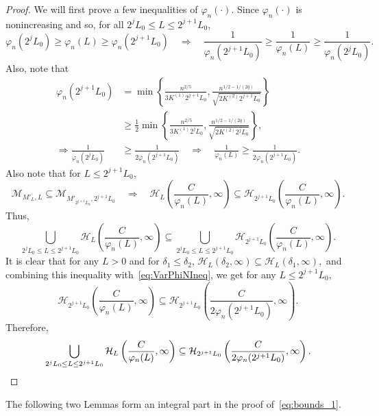 \begin{proof}
We will first prove a few inequalities of $\varphi_n(\cdot)$. Since $\varphi_n(\cdot)$ is nonincreasing and so, for all $2^jL_0 \le L \le 2^{j+1}L_0$,
\[
\varphi_n(2^jL_0) \ge \varphi_n(L) \ge \varphi_n(2^{j+1}L_0)\quad\Rightarrow\quad \frac{1}{\varphi_n(2^{j+1}L_0)} \ge \frac{1}{\varphi_n(L)} \ge \frac{1}{\varphi_n(2^jL_0)}.
\]
Also, note that
\begin{align}
\varphi_n(2^{j+1}L_0) &= \min\left\{\frac{n^{2/5}}{3K^{(1)}2^{j+1}L_0}, \frac{n^{1/2 - 1/(2q)}}{\sqrt{2K^{(2)}2^{j+1}L_0}}\right\}\nonumber\\
&\ge \frac{1}{2}\min\left\{\frac{n^{2/5}}{3K^{(1)}2^{j}L_0}, \frac{n^{1/2 - 1/(2q)}}{\sqrt{2K^{(2)}2^{j}L_0}}\right\},\nonumber\\
\Rightarrow \frac{1}{\varphi_n(2^jL_0)} &\ge \frac{1}{2\varphi_n(2^{j+1}L_0)}\quad\Rightarrow\quad \frac{1}{\varphi_n(L)} \ge \frac{1}{2\varphi_n(2^{j+1}L_0)}.\label{eq:VarPhiNIneq}
\end{align}
Also note that for $L \le 2^{j+1}L_0$,
\[
\mathcal{M}_{M'_L, L} \subseteq \mathcal{M}_{M'_{2^{j+1}L_0}, 2^{j+1}L_0}\quad\Rightarrow\quad \mathcal{H}_{L}\left(\frac{C}{\varphi_n(L)}, \infty\right)\subseteq\mathcal{H}_{2^{j+1}L_0}\left(\frac{C}{\varphi_n(L)}, \infty\right).
\]
Thus,
\begin{equation*}
\bigcup_{2^jL_0 \le L\le 2^{j+1}L_0}\mathcal{H}_L\left(\frac{C}{\varphi_n(L)}, \infty\right) \subseteq \bigcup_{2^jL_0 \le L\le 2^{j+1}L_0}\mathcal{H}_{2^{j+1}L_0}\left(\frac{C}{\varphi_n(L)}, \infty\right).
\end{equation*}
It is clear that for any $L > 0$ and for $\delta_1 \le \delta_2$, $\mathcal{H}_L\left(\delta_2, \infty\right) \subseteq \mathcal{H}_L\left(\delta_1, \infty\right),$ and combining this inequality with~\eqref{eq:VarPhiNIneq}, we get for any $L \le 2^{j+1}L_0$,
\[
\mathcal{H}_{2^{j+1}L_0}\left(\frac{C}{\varphi_n(L)}, \infty\right)\subseteq\mathcal{H}_{2^{j+1}L_0}\left(\frac{C}{2\varphi_n(2^{j+1}L_0)}, \infty\right).
\]
Therefore,
\[
\bigcup_{2^jL_0 \le L\le 2^{j+1}L_0}\mathcal{H}_L\left(\frac{C}{\varphi_n(L)}, \infty\right)\subseteq \mathcal{H}_{2^{j+1}L_0}\left(\frac{C}{2\varphi_n(2^{j+1}L_0)}, \infty\right).\qedhere
\]
\end{proof}
The following two Lemmas form an integral part in the proof of~\eqref{eq:bounds_1}.


